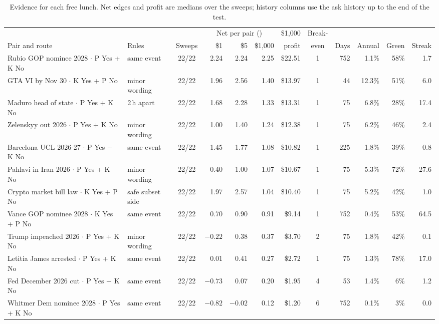 \documentclass[5p,letterpaper]{elsarticle}
\newcommand{\cent}{\textcent}
\begin{document}
\begin{table}[t]
\caption{Evidence for each free lunch. Net edges and profit are medians over the sweeps; history columns use the ask history up to the end of the test.}\label{tab:evidence}
\footnotesize
\setlength{\tabcolsep}{4pt}
\begin{tabularx}{\textwidth}{@{}lLcrrrrcrrrr@{}}
\toprule
 & & & \multicolumn{3}{c}{Net per pair (\cent)} & \$1,000 & Break- & & & & \\
\cmidrule(lr){4-6}
Pair and route & Rules & Sweeps & \$1 & \$5 & \$1,000 & profit & even & Days & Annual & Green & Streak \\
\midrule
Rubio GOP nominee 2028 $\cdot$ P Yes + K No & same event & 22/22 & 2.24 & 2.24 & 2.25 & \$22.51 & 1 & 752 & 1.1\% & 58\% & 1.7 \\
GTA VI by Nov 30 $\cdot$ K Yes + P No & minor wording & 22/22 & 1.96 & 2.56 & 1.40 & \$13.97 & 1 & 44 & 12.3\% & 51\% & 6.0 \\
Maduro head of state $\cdot$ P Yes + K No & 2\,h apart & 22/22 & 1.68 & 2.28 & 1.33 & \$13.31 & 1 & 75 & 6.8\% & 28\% & 17.4 \\
Zelenskyy out 2026 $\cdot$ P Yes + K No & minor wording & 22/22 & 1.00 & 1.40 & 1.24 & \$12.38 & 1 & 75 & 6.2\% & 46\% & 2.4 \\
Barcelona UCL 2026-27 $\cdot$ P Yes + K No & same event & 22/22 & 1.45 & 1.77 & 1.08 & \$10.82 & 1 & 225 & 1.8\% & 39\% & 0.8 \\
Pahlavi in Iran 2026 $\cdot$ P Yes + K No & minor wording & 22/22 & 0.40 & 1.00 & 1.07 & \$10.67 & 1 & 75 & 5.3\% & 72\% & 27.6 \\
Crypto market bill law $\cdot$ K Yes + P No & safe subset side & 22/22 & 1.97 & 2.57 & 1.04 & \$10.40 & 1 & 75 & 5.2\% & 42\% & 1.0 \\
Vance GOP nominee 2028 $\cdot$ K Yes + P No & same event & 22/22 & 0.70 & 0.90 & 0.91 & \$9.14 & 1 & 752 & 0.4\% & 53\% & 64.5 \\
Trump impeached 2026 $\cdot$ P Yes + K No & minor wording & 22/22 & $-0.22$ & 0.38 & 0.37 & \$3.70 & 2 & 75 & 1.8\% & 42\% & 0.1 \\
Letitia James arrested $\cdot$ P Yes + K No & same event & 22/22 & 0.01 & 0.41 & 0.27 & \$2.72 & 1 & 75 & 1.3\% & 78\% & 17.0 \\
Fed December 2026 cut $\cdot$ P Yes + K No & same event & 22/22 & $-0.73$ & 0.07 & 0.20 & \$1.95 & 4 & 53 & 1.4\% & 6\% & 1.2 \\
Whitmer Dem nominee 2028 $\cdot$ P Yes + K No & same event & 22/22 & $-0.82$ & $-0.02$ & 0.12 & \$1.20 & 6 & 752 & 0.1\% & 3\% & 0.0 \\

\end{tabularx}
\end{table}
\end{document}

